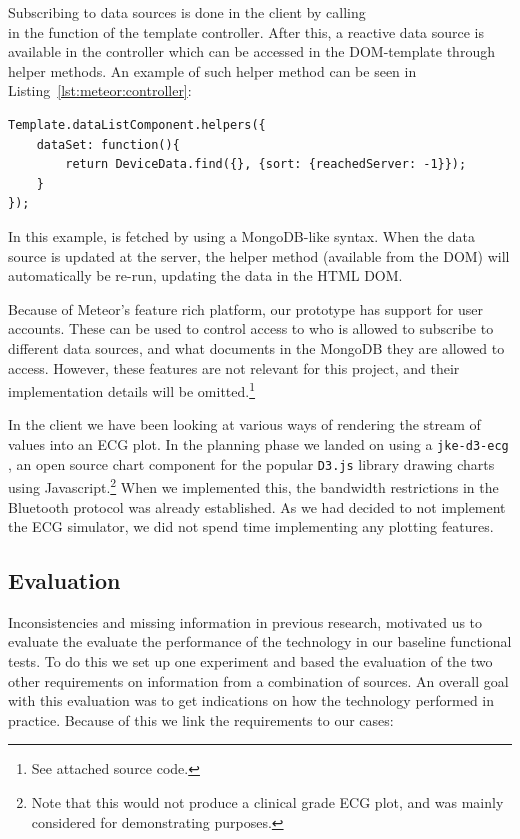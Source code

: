 Subscribing to data sources is done in the client by calling\\  in the  function of the template controller. After this, a reactive data source is available in the controller which can be accessed in the DOM-template through helper methods. An example of such helper method can be seen in Listing~\ref{lst:meteor:controller}:\\

\begin{lstlisting}[caption={Template helper exposing a reactive data source}, label={lst:meteor:controller}, basicstyle=\small]
Template.dataListComponent.helpers({
    dataSet: function(){
        return DeviceData.find({}, {sort: {reachedServer: -1}});
    }
});
\end{lstlisting}
In this example,  is fetched by using a MongoDB-like syntax. When the data source is updated at the server, the  helper method (available from the DOM) will automatically be re-run, updating the data in the HTML DOM.

Because of Meteor's feature rich platform, our prototype has support for user accounts. These can be used to control access to who is allowed to subscribe to different data sources, and what documents in the MongoDB they are allowed to access. However, these features are not relevant for this project, and their implementation details will be omitted.\footnote{ See attached source code.}

In the client we have been looking at various ways of rendering the stream of values into an ECG plot. In the planning phase we landed on using a \texttt{jke-d3-ecg} \cite{jke:d3}, an open source chart component for the popular \texttt{D3.js} library drawing charts using Javascript.\footnote{ Note that this would not produce a clinical grade ECG plot, and was mainly considered for demonstrating purposes.} When we implemented this, the bandwidth restrictions in the Bluetooth protocol was already established. As we had decided to not implement the ECG simulator, we did not spend time implementing any plotting features.


\subsection{Evaluation} %
\label{sub:evaluation}

Inconsistencies and missing information in previous research, motivated us to evaluate the evaluate the performance of the technology in our baseline functional tests. To do this we set up one experiment and based the evaluation of the two other requirements on information from a combination of sources. An overall goal with this evaluation was to get indications on how the technology performed in practice. Because of this we link the requirements to our cases:

